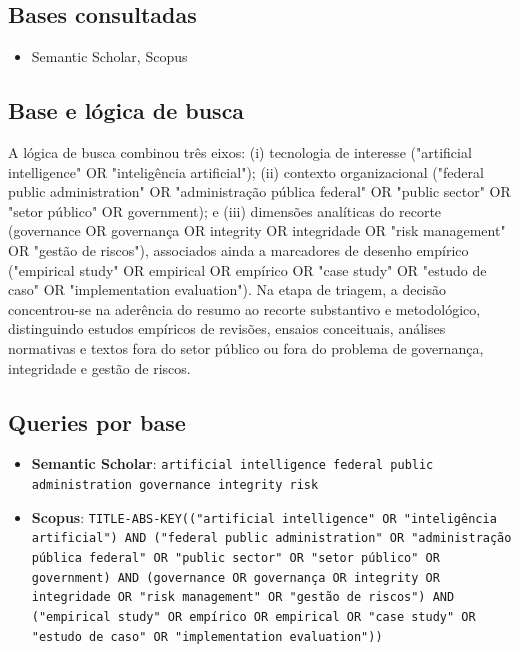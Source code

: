 \documentclass[12pt,a4paper]{article}
\begin{document}
\subsection{Bases consultadas}
\label{sec:org302f09e}

\begin{itemize}
\item Semantic Scholar, Scopus
\end{itemize}

\subsection{Base e lógica de busca}
\label{sec:org67e5478}

A lógica de busca combinou três eixos: (i) tecnologia de interesse ("artificial intelligence" OR "inteligência artificial"); (ii) contexto organizacional ("federal public administration" OR "administração pública federal" OR "public sector" OR "setor público" OR government); e (iii) dimensões analíticas do recorte (governance OR governança OR integrity OR integridade OR "risk management" OR "gestão de riscos"), associados ainda a marcadores de desenho empírico ("empirical study" OR empirical OR empírico OR "case study" OR "estudo de caso" OR "implementation evaluation"). Na etapa de triagem, a decisão concentrou-se na aderência do resumo ao recorte substantivo e metodológico, distinguindo estudos empíricos de revisões, ensaios conceituais, análises normativas e textos fora do setor público ou fora do problema de governança, integridade e gestão de riscos.

\subsection{Queries por base}
\label{sec:org8a2f525}

\begin{itemize}
\item \textbf{Semantic Scholar}: \texttt{artificial intelligence federal public administration governance integrity risk}
\item \textbf{Scopus}: \texttt{TITLE-ABS-KEY(("artificial intelligence" OR "inteligência artificial") AND ("federal public administration" OR "administração pública federal" OR "public sector" OR "setor público" OR government) AND (governance OR governança OR integrity OR integridade OR "risk management" OR "gestão de riscos") AND ("empirical study" OR empírico OR empirical OR "case study" OR "estudo de caso" OR "implementation evaluation"))}
\end{itemize}
\end{document}
